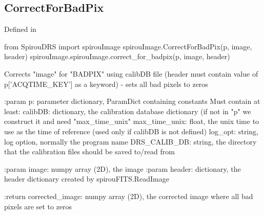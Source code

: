 \noindent\begin{minipage}{\textwidth}
\subsection{CorrectForBadPix}

Defined in \spirouImage{}

\begin{pythonbox}
from SpirouDRS import spirouImage
spirouImage.CorrectForBadPix(p, image, header)
spirouImage.spirouImage.correct_for_badpix(p, image, header)
\end{pythonbox}

\begin{pythondocstring}
Corrects "image" for "BADPIX" using calibDB file (header must contain
value of p['ACQTIME_KEY'] as a keyword) - sets all bad pixels to zeros

:param p: parameter dictionary, ParamDict containing constants
    Must contain at least:
            calibDB: dictionary, the calibration database dictionary
                     (if not in "p" we construct it and need "max_time_unix"
            max_time_unix: float, the unix time to use as the time of
                            reference (used only if calibDB is not defined)
            log_opt: string, log option, normally the program name
            DRS_CALIB_DB: string, the directory that the calibration
                          files should be saved to/read from

:param image: numpy array (2D), the image
:param header: dictionary, the header dictionary created by
               spirouFITS.ReadImage

:return corrected_image: numpy array (2D), the corrected image where all
                         bad pixels are set to zeros
\end{pythondocstring}
\end{minipage}

